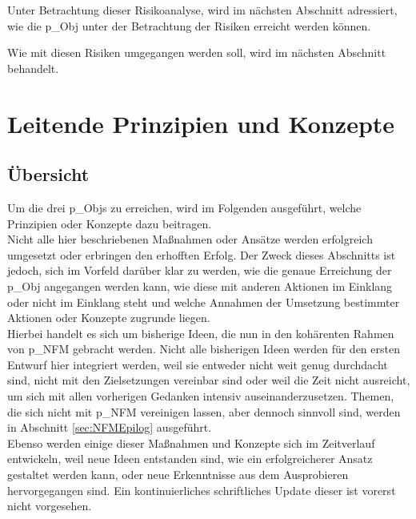 Unter Betrachtung dieser Risikoanalyse, wird im nächsten Abschnitt adressiert, wie die \gls{p_Obj} unter der Betrachtung der Risiken erreicht werden können.

Wie mit diesen Risiken umgegangen werden soll, wird im nächsten Abschnitt behandelt.

\section{Leitende Prinzipien und Konzepte}\label{sec:Erreichung}
\subsection{Übersicht}
Um die drei \glspl{p_Obj} zu erreichen, wird im Folgenden ausgeführt, welche Prinzipien oder Konzepte dazu beitragen.\\

Nicht alle hier beschriebenen Maßnahmen oder Ansätze werden erfolgreich umgesetzt oder erbringen den erhofften Erfolg. Der Zweck dieses Abschnitts ist jedoch, sich im Vorfeld darüber klar zu werden, wie die genaue Erreichung der \gls{p_Obj} angegangen werden kann, wie diese mit anderen Aktionen im Einklang oder nicht im Einklang steht und welche Annahmen der Umsetzung bestimmter Aktionen oder Konzepte zugrunde liegen.\\

Hierbei handelt es sich um bisherige Ideen, die nun in den kohärenten Rahmen von \gls{p_NFM} gebracht werden. Nicht alle bisherigen Ideen werden für den ersten Entwurf hier integriert werden, weil sie entweder nicht weit genug durchdacht sind, nicht mit den Zielsetzungen vereinbar sind oder weil die Zeit nicht ausreicht, um sich mit allen vorherigen Gedanken intensiv auseinanderzusetzen. Themen, die sich nicht mit \gls{p_NFM} vereinigen lassen, aber dennoch sinnvoll sind, werden in Abschnitt \ref{sec:NFMEpilog} ausgeführt.\\

Ebenso werden einige dieser Maßnahmen und Konzepte sich im Zeitverlauf entwickeln, weil neue Ideen entstanden sind, wie ein erfolgreicherer Ansatz gestaltet werden kann, oder neue Erkenntnisse aus dem Ausprobieren hervorgegangen sind. Ein kontinuierliches schriftliches Update dieser ist vorerst nicht vorgesehen.


